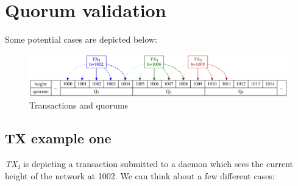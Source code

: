 \hypertarget{quorum-validation}{%
\section{Quorum validation}\label{quorum-validation}}

Some potential cases are depicted below:

\begin{figure}
\centering
\includegraphics{quorums.svg}
\caption{Transactions and quorums}
\end{figure}

\hypertarget{tx-example-one}{%
\subsection{TX example one}\label{tx-example-one}}

\emph{TX₁} is depicting a transaction submitted to a daemon which sees
the current height of the network at 1002. We can think about a few
different cases:

